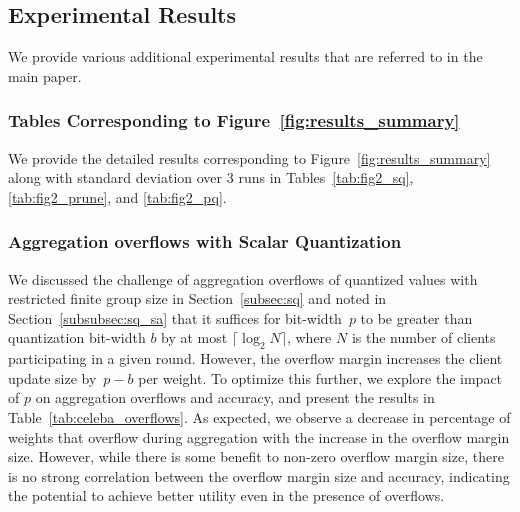 \subsection{Experimental Results}
\label{appendix:results}

We provide various additional experimental results that are referred to in the main paper.
\subsubsection{Tables Corresponding to Figure~\ref{fig:results_summary}}
\label{appendix:table}
We provide the detailed results corresponding to Figure~\ref{fig:results_summary} along with standard deviation over 3 runs in Tables~\ref{tab:fig2_sq}, \ref{tab:fig2_prune}, and \ref{tab:fig2_pq}.

\subsubsection{Aggregation overflows with Scalar Quantization}
\label{appendix:overflow}
We discussed the challenge of aggregation overflows of quantized values with restricted \SecAgg finite group size in Section~\ref{subsec:sq} and noted in Section~\ref{subsubsec:sq_sa} that it suffices for \SecAgg bit-width~$p$ to be greater than quantization bit-width $b$ by at most $\lceil\log_2 N\rceil$, where $N$ is the number of clients participating in a given round. However, the overflow margin increases the client update size by~$p - b$ per weight. To optimize this further, we explore the impact of $p$ on aggregation overflows and accuracy, and present the results in Table~\ref{tab:celeba_overflows}.
As expected, we observe a decrease in percentage of weights that overflow during aggregation with the increase in the overflow margin size. However, while there is some benefit to non-zero overflow margin size, there is no strong correlation between the overflow margin size and accuracy, indicating the potential to achieve better utility even in the presence of overflows.

